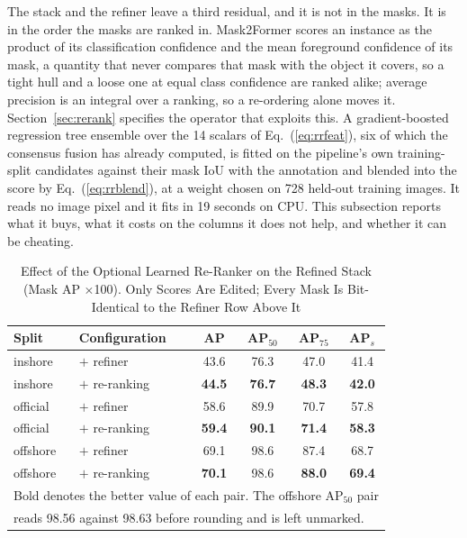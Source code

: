 The stack and the refiner leave a third residual, and it is not in the masks. It is in the order the masks are ranked in. Mask2Former scores an instance as the product of its classification confidence and the mean foreground confidence of its mask, a quantity that never compares that mask with the object it covers, so a tight hull and a loose one at equal class confidence are ranked alike; average precision is an integral over a ranking, so a re-ordering alone moves it. Section~\ref{sec:rerank} specifies the operator that exploits this. A gradient-boosted regression tree ensemble over the 14 scalars of Eq.~(\ref{eq:rrfeat}), six of which the consensus fusion has already computed, is fitted on the pipeline's own training-split candidates against their mask IoU with the annotation and blended into the score by Eq.~(\ref{eq:rrblend}), at a weight chosen on 728 held-out training images. It reads no image pixel and it fits in 19 seconds on CPU. This subsection reports what it buys, what it costs on the columns it does not help, and whether it can be cheating.

\begin{table}[!t]
\caption{Effect of the Optional Learned Re-Ranker on the Refined Stack (Mask AP $\times$100). Only Scores Are Edited; Every Mask Is Bit-Identical to the Refiner Row Above It}
\label{tab:rerank}
\centering
\begin{tabular}{llcccc}
\toprule
Split & Configuration & AP & AP$_{50}$ & AP$_{75}$ & AP$_s$ \\
\midrule
inshore & $+$ refiner & 43.6 & 76.3 & 47.0 & 41.4 \\
inshore & $+$ re-ranking & \textbf{44.5} & \textbf{76.7} & \textbf{48.3} & \textbf{42.0} \\
\addlinespace
official & $+$ refiner & 58.6 & 89.9 & 70.7 & 57.8 \\
official & $+$ re-ranking & \textbf{59.4} & \textbf{90.1} & \textbf{71.4} & \textbf{58.3} \\
\addlinespace
offshore & $+$ refiner & 69.1 & 98.6 & 87.4 & 68.7 \\
offshore & $+$ re-ranking & \textbf{70.1} & 98.6 & \textbf{88.0} & \textbf{69.4} \\
\bottomrule
\multicolumn{6}{l}{\footnotesize Bold denotes the better value of each pair. The offshore AP$_{50}$ pair} \\
\multicolumn{6}{l}{\footnotesize reads 98.56 against 98.63 before rounding and is left unmarked.}
\end{tabular}
\end{table}

